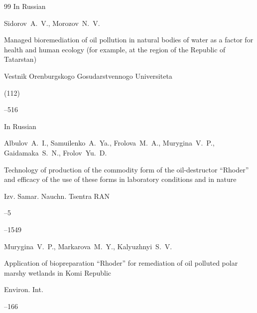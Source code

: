 \begin{thebibliography}{99}
\lang In Russian

\by Sidorov~A.~V., Morozov~N.~V.

\paper Managed bioremediation of oil pollution in natural bodies of water as a factor for health and human ecology (for example, at  the region of the Republic of Tatarstan)

\jour Vestnik Orenburgskogo Gosudarstvennogo Universiteta


(112)

--516






\lang In Russian

\by Albulov~A.~I., Samuilenko~A.~Ya., Frolova~M.~A., Murygina~V.~P., Gaidamaka~S.~N., Frolov~Yu.~D.

\paper Technology of production of the commodity form of the oil-destructor ``Rhoder'' and efficacy of the use of these forms in laboratory conditions and in nature

\jour Izv. Samar. Nauchn. Tsentra RAN



--5

--1549




\by Murygina~V.~P., Markarova~M.~Y., Kalyuzhnyi~S.~V.

\paper Application of biopreparation ``Rhoder'' for remediation of oil polluted polar marshy wetlands in Komi Republic

\jour Environ. Int.




--166






\end{thebibliography}

\EngDate



\newpage

\Russian





%

%

